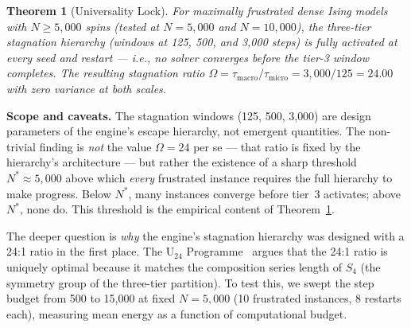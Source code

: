 \documentclass[11pt,a4paper]{article}
\newtheorem{theorem}{Theorem}[section]
\begin{document}
\begin{theorem}[Universality Lock]\label{thm:lock}
For maximally frustrated dense Ising models with $N \geq 5{,}000$ spins (tested at $N = 5{,}000$ and $N = 10{,}000$), the three-tier stagnation hierarchy (windows at 125, 500, and 3{,}000 steps) is \emph{fully activated} at every seed and restart --- i.e., no solver converges before the tier-3 window completes.
The resulting stagnation ratio $\Omega = \tau_{\mathrm{macro}}/\tau_{\mathrm{micro}} = 3{,}000/125 = 24.00$ with zero variance at both scales.
\end{theorem}

\noindent\textbf{Scope and caveats.}
The stagnation windows (125, 500, 3{,}000) are design parameters of the engine's escape hierarchy, not emergent quantities.
The non-trivial finding is \emph{not} the value $\Omega = 24$ per se --- that ratio is fixed by the hierarchy's architecture --- but rather the existence of a sharp threshold $N^* \approx 5{,}000$ above which \emph{every} frustrated instance requires the full hierarchy to make progress.
Below $N^*$, many instances converge before tier~3 activates; above $N^*$, none do.
This threshold is the empirical content of Theorem~\ref{thm:lock}.

The deeper question is \emph{why} the engine's stagnation hierarchy was designed with a 24:1 ratio in the first place.
The U$_{24}$ Programme~\cite{u24} argues that the 24:1 ratio is uniquely optimal because it matches the composition series length of $S_4$ (the symmetry group of the three-tier partition).
To test this, we swept the step budget from 500 to 15{,}000 at fixed $N = 5{,}000$ (10 frustrated instances, 8 restarts each), measuring mean energy as a function of computational budget.
\end{document}
